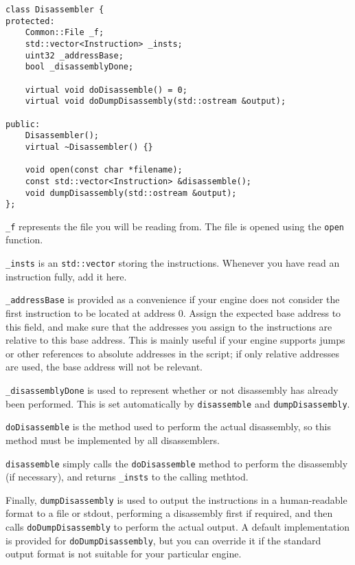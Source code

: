\begin{C++}
\begin{lstlisting}
class Disassembler {
protected:
	Common::File _f;
	std::vector<Instruction> _insts;
	uint32 _addressBase;
	bool _disassemblyDone;

	virtual void doDisassemble() = 0;
	virtual void doDumpDisassembly(std::ostream &output);

public:
	Disassembler();
	virtual ~Disassembler() {}

	void open(const char *filename);
	const std::vector<Instruction> &disassemble();
	void dumpDisassembly(std::ostream &output);
};
\end{lstlisting}
\end{C++}

\verb+_f+ represents the file you will be reading from. The file is opened using the \verb+open+ function.

\verb+_insts+ is an \verb+std::vector+ storing the instructions. Whenever you have read an instruction fully, add it here.

\verb+_addressBase+ is provided as a convenience if your engine does not consider the first instruction to be located at address 0. Assign the expected base address to this field, and make sure that the addresses you assign to the instructions are relative to this base address. This is mainly useful if your engine supports jumps or other references to absolute addresses in the script; if only relative addresses are used, the base address will not be relevant.

\verb+_disassemblyDone+ is used to represent whether or not disassembly has already been performed. This is set automatically by \verb+disassemble+ and  \verb+dumpDisassembly+.

\verb+doDisassemble+ is the method used to perform the actual disassembly, so this method must be implemented by all disassemblers.

\verb+disassemble+ simply calls the \verb+doDisassemble+ method to perform the disassembly (if necessary), and returns \verb+_insts+ to the calling methtod.

Finally, \verb+dumpDisassembly+ is used to output the instructions in a human-readable format to a file or stdout, performing a disassembly first if required, and then calls \verb+doDumpDisassembly+ to perform the actual output. A default implementation is provided for \verb+doDumpDisassembly+, but you can override it if the standard output format is not suitable for your particular engine.

